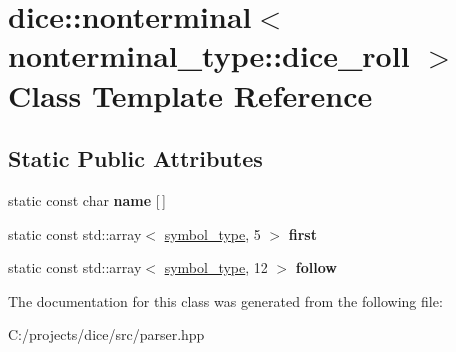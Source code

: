\hypertarget{classdice_1_1nonterminal_3_01nonterminal__type_1_1dice__roll_01_4}{}\section{dice\+:\+:nonterminal$<$ nonterminal\+\_\+type\+:\+:dice\+\_\+roll $>$ Class Template Reference}
\label{classdice_1_1nonterminal_3_01nonterminal__type_1_1dice__roll_01_4}
\subsection*{Static Public Attributes}
\begin{DoxyCompactItemize}
\item 
\mbox{\label{classdice_1_1nonterminal_3_01nonterminal__type_1_1dice__roll_01_4_a6aa8e87cfa2d56d0e52f12392cec493d}} 
static const char {\bfseries name} \mbox{[}$\,$\mbox{]}
\item 
\mbox{\label{classdice_1_1nonterminal_3_01nonterminal__type_1_1dice__roll_01_4_aa772f327b119c60a8482f8d55baac0bd}} 
static const std\+::array$<$ \mbox{\hyperlink{symbols_8hpp_ab0295a855bb7eadc138abd6993af3aea}{symbol\+\_\+type}}, 5 $>$ {\bfseries first}
\item 
\mbox{\label{classdice_1_1nonterminal_3_01nonterminal__type_1_1dice__roll_01_4_ac8fdea83740eeec5db4ed5ef4955453e}} 
static const std\+::array$<$ \mbox{\hyperlink{symbols_8hpp_ab0295a855bb7eadc138abd6993af3aea}{symbol\+\_\+type}}, 12 $>$ {\bfseries follow}
\end{DoxyCompactItemize}


The documentation for this class was generated from the following file\+:\begin{DoxyCompactItemize}
\item 
C\+:/projects/dice/src/parser.\+hpp\end{DoxyCompactItemize}
